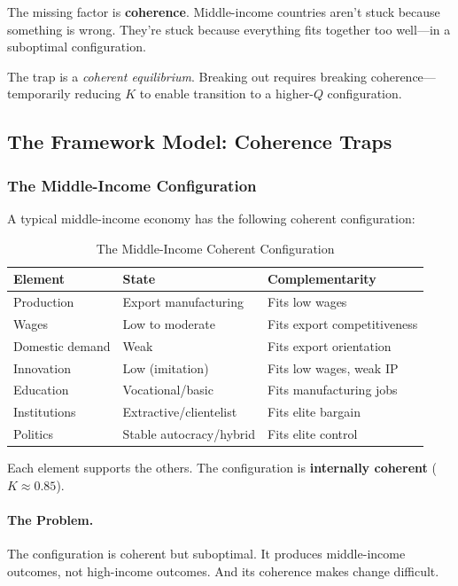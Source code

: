 The missing factor is \textbf{coherence}. Middle-income countries aren't stuck 
because something is wrong. They're stuck because everything fits together 
too well---in a suboptimal configuration.

The trap is a \emph{coherent equilibrium}. Breaking out requires breaking 
coherence---temporarily reducing $K$ to enable transition to a higher-$Q$ 
configuration.

\subsection{The Framework Model: Coherence Traps}

\subsubsection{The Middle-Income Configuration}

A typical middle-income economy has the following coherent configuration:

\begin{table}[htbp]
\centering
\caption{The Middle-Income Coherent Configuration}
\label{tab:mi-config}
\begin{tabular}{@{}lll@{}}
\toprule
\textbf{Element} & \textbf{State} & \textbf{Complementarity} \\
\midrule
Production & Export manufacturing & Fits low wages \\
Wages & Low to moderate & Fits export competitiveness \\
Domestic demand & Weak & Fits export orientation \\
Innovation & Low (imitation) & Fits low wages, weak IP \\
Education & Vocational/basic & Fits manufacturing jobs \\
Institutions & Extractive/clientelist & Fits elite bargain \\
Politics & Stable autocracy/hybrid & Fits elite control \\
\bottomrule
\end{tabular}
\end{table}

Each element supports the others. The configuration is \textbf{internally coherent} ($K \approx 0.85$).

\paragraph{The Problem.}
The configuration is coherent but suboptimal. It produces middle-income 
outcomes, not high-income outcomes. And its coherence makes change difficult.

